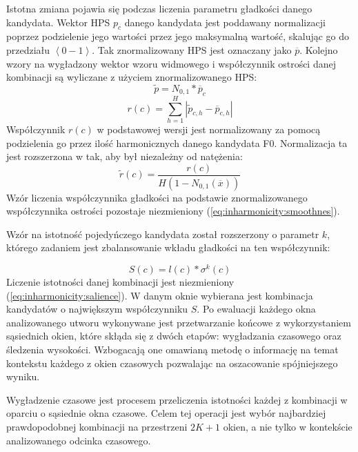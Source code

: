 \documentclass[12pt,a4paper,twoside]{mwart}
\begin{document}
Istotna zmiana pojawia się podczas liczenia parametru gładkości danego kandydata. Wektor HPS $p_c$ danego kandydata jest poddawany normalizacji poprzez podzielenie jego wartości przez jego maksymalną wartość, skalując go do przedziału $\left<0-1\right>$. Tak znormalizowany HPS jest oznaczany jako $\overline{p}$. Kolejno wzory na wygładzony wektor wzoru widmowego i współczynnik ostrości danej kombinacji są wyliczane z użyciem znormalizowanego HPS:
\begin{equation}\label{eq:inharmonicity2:hpsSmoothed}
  \widetilde{p} = N_{0,1}\ast \overline{p}_c 
\end{equation}
\begin{equation}\label{eq:inharmonicity2:sharpness}
  r(c) = \sum_{h=1}^H\left|\widetilde{p}_{c,h} - \overline{p}_{c,h} \right|
\end{equation}
Współczynnik $r(c)$ w podstawowej wersji jest normalizowany za pomocą podzielenia go przez ilość harmonicznych danego kandydata F0. Normalizacja ta jest rozszerzona w \cite[5-6]{Transcription:Pertus:Inharmonicity2} tak, aby był niezależny od natężenia:
\begin{equation}\label{eq:inharmonicity2:roughness}
  \widetilde{r}(c) = \frac{r(c)}{H(1 - N_{0, 1}(\overline{x}))}
\end{equation}
Wzór liczenia współczynnika gładkości na podstawie znormalizowanego współczynnika ostrości pozostaje niezmieniony (\ref{eq:inharmonicity:smoothnes}).

Wzór na istotność pojedyńczego kandydata został rozszerzony o parametr $k$, którego zadaniem jest zbalansowanie wkładu gładkości na ten współczynnik:

\begin{equation}\label{eq:inharmonicity2:salience}
S(c) = l(c) * \sigma^k(c)
\end{equation}
Liczenie istotności danej kombinacji jest niezmieniony (\ref{eq:inharmonicity:salience}). W danym oknie wybierana jest kombinacja kandydatów o największym współczynniku $S$. Po ewaluacji każdego okna analizowanego utworu wykonywane jest przetwarzanie końcowe z wykorzystaniem sąsiednich okien, które skłąda się z dwóch etapów: wygładzania czasowego oraz śledzenia wysokości. Wzbogacają one omawianą metodę o informację na temat kontekstu każdego z okien czasowych pozwalając na oszacowanie spójniejszego wyniku.

Wygładzenie czasowe jest procesem przeliczenia istotności każdej z kombinacji w oparciu o sąsiednie okna czasowe. Celem tej operacji jest wybór najbardziej prawdopodobnej kombinacji na przestrzeni $2K + 1$ okien, a nie tylko w kontekście analizowanego odcinka czasowego.
\end{document}
